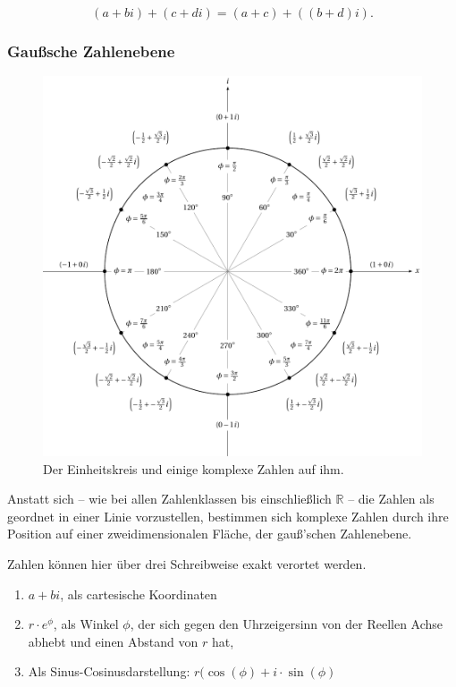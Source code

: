 \documentclass{scrartcl}
\begin{document}
\begin{equation}
	(a + bi) + (c + di) = (a+c) + ((b+d)i).
\end{equation}

\subsubsection{Gaußsche Zahlenebene}

\begin{figure}[h!]
	\includegraphics[width=\textwidth]{unit.pdf}
	\caption{Der Einheitskreis und einige komplexe Zahlen auf ihm.}
\end{figure}

Anstatt sich -- wie bei allen Zahlenklassen bis einschließlich $\mathbb{R}$ -- die Zahlen als geordnet in einer Linie vorzustellen,
bestimmen sich komplexe Zahlen durch ihre Position auf einer zweidimensionalen Fläche, der gauß'schen Zahlenebene.

Zahlen können hier über drei Schreibweise exakt verortet werden.

\begin{enumerate}
	\item $a + bi$, als cartesische Koordinaten
	\item $r \cdot e^\phi$, als Winkel $\phi$, der sich gegen den Uhrzeigersinn von der Reellen Achse abhebt und einen Abstand
		von $r$ hat,
	\item Als Sinus-Cosinusdarstellung: $r (\cos(\phi) + i\cdot\sin(\phi)$
\end{enumerate}
\end{document}
